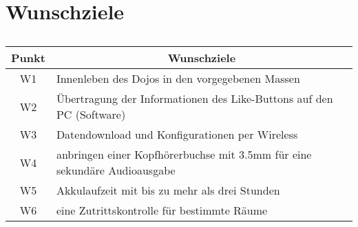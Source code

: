 \section*{Wunschziele}
\begin{table}[h]
\centering
\begin{tabular}{c|c|l}
	\toprule 
	\textbf{Punkt} & \multicolumn{2}{c}{\textbf{Wunschziele}} \\ 
	\hline 
	W1 & \multicolumn{2}{l}{Innenleben des Dojos in den vorgegebenen Massen} \\
	\hline 
	W2 & \multicolumn{2}{l}{Übertragung der Informationen des Like-Buttons auf den PC (Software)} \\
	\hline 
	W3 & \multicolumn{2}{l}{Datendownload und Konfigurationen per Wireless} \\
	\hline 
	W4 & \multicolumn{2}{l}{anbringen einer Kopfhörerbuchse mit 3.5mm für eine sekundäre Audioausgabe} \\ 
	\hline 
	W5 & \multicolumn{2}{l}{Akkulaufzeit mit bis zu mehr als drei Stunden} \\
	\hline 
	W6 & \multicolumn{2}{l}{eine Zutrittskontrolle für bestimmte Räume} \\
	\bottomrule 
	\end{tabular}
\caption{}
\label{tab:wunschziele}
\end{table}	
